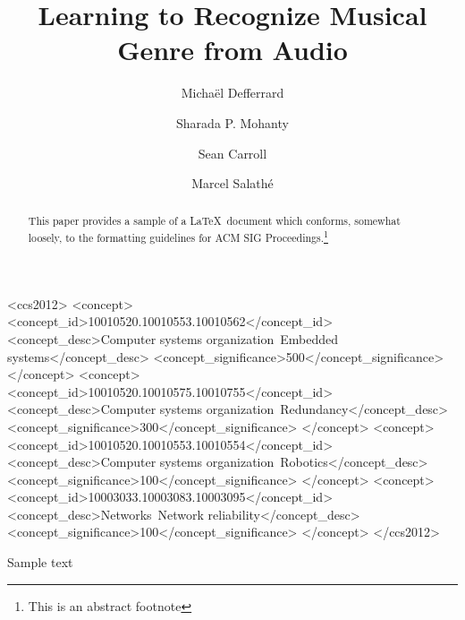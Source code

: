 \documentclass[sigconf]{acmart}
\begin{document}
\title{Learning to Recognize Musical Genre from Audio}


\author{Michaël Defferrard}

\author{Sharada P. Mohanty}

\author{Sean Carroll}

\author{Marcel Salathé}




\begin{abstract}
This paper provides a sample of a \LaTeX\ document which conforms,
somewhat loosely, to the formatting guidelines for
ACM SIG Proceedings.\footnote{This is an abstract footnote}
\end{abstract}

%
%
\begin{CCSXML}
<ccs2012>
 <concept>
  <concept_id>10010520.10010553.10010562</concept_id>
  <concept_desc>Computer systems organization~Embedded systems</concept_desc>
  <concept_significance>500</concept_significance>
 </concept>
 <concept>
  <concept_id>10010520.10010575.10010755</concept_id>
  <concept_desc>Computer systems organization~Redundancy</concept_desc>
  <concept_significance>300</concept_significance>
 </concept>
 <concept>
  <concept_id>10010520.10010553.10010554</concept_id>
  <concept_desc>Computer systems organization~Robotics</concept_desc>
  <concept_significance>100</concept_significance>
 </concept>
 <concept>
  <concept_id>10003033.10003083.10003095</concept_id>
  <concept_desc>Networks~Network reliability</concept_desc>
  <concept_significance>100</concept_significance>
 </concept>
</ccs2012>
\end{CCSXML}





\maketitle

Sample text



\end{document}
